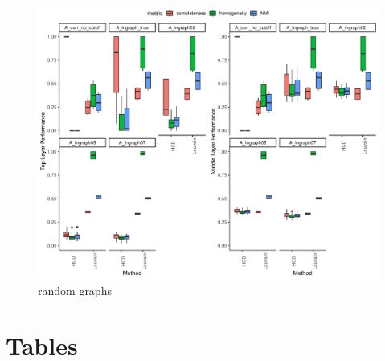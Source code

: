 \documentclass[
]{article}
\begin{document}
\begin{figure}
\centering
\includegraphics{Lab_report_3_13_2024_files/figure-latex/unnamed-chunk-4-1.pdf}
\caption{random graphs}
\end{figure}

\newpage 
\section*{Tables}
\end{document}

